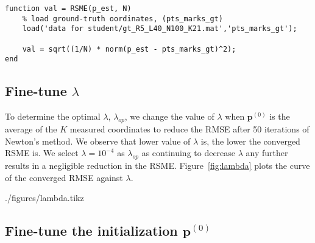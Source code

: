 \documentclass[12pt]{article}
\begin{document}
\begin{lstlisting}[style=Matlab-editor, caption={MATLAB Implementation of RSME}, label={list:rsme}]
function val = RSME(p_est, N)
    % load ground-truth oordinates, (pts_marks_gt)
    load('data for student/gt_R5_L40_N100_K21.mat','pts_marks_gt');

    val = sqrt((1/N) * norm(p_est - pts_marks_gt)^2);
end
\end{lstlisting}

\subsection*{Fine-tune $\lambda$}
To determine the optimal $\lambda$, $\lambda_{op}$, we change the value of $\lambda$ when $\mathbf{p}^{(0)}$ is the average of the $K$ measured coordinates to reduce the RMSE after 50 iterations of Newton's method. We observe that lower value of $\lambda$ is, the lower the converged RSME is. We select $\lambda = 10^{-4}$ as $\lambda_{op}$ as continuing to decrease $\lambda$ any further results in a negligible reduction in the RSME. Figure~\ref{fig:lambda} plots the curve of the converged RMSE against $\lambda$. 

\begin{filecontents}[overwrite]{./figures/lambda.tikz}
\end{filecontents}

\subsection*{Fine-tune the initialization $\mathbf{p}^{(0)}$}
\end{document}
